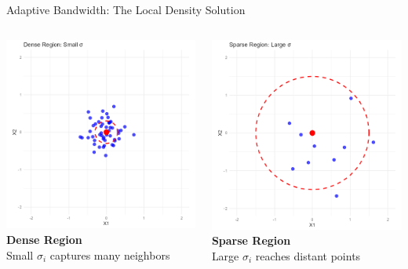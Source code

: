 \documentclass[aspectratio=169]{beamer}
\begin{document}
\begin{frame}{Adaptive Bandwidth: The Local Density Solution}
\begin{columns}
\includegraphics[width=\textwidth]{./Figures/adaptive_bandwidth_dense.png}
\textbf{Dense Region}\\
Small $\sigma_i$ captures many neighbors

\includegraphics[width=\textwidth]{./Figures/adaptive_bandwidth_sparse.png}
\textbf{Sparse Region}\\
Large $\sigma_i$ reaches distant points
\end{columns}


\end{frame}
\end{document}
